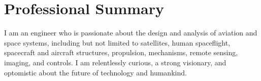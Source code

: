 \documentclass[10pt,final,sans]{resume}
\begin{document}
\setlength\headheight{28pt} %

\section{Professional Summary}
I am an engineer who is passionate about the design and analysis of
aviation and space systems, including but not limited to satellites, human
spaceflight, spacecraft and aircraft structures, propulsion, mechanisms, remote sensing, 
imaging, and controls. I am relentlessly curious, a strong visionary, and
optomistic about the future of technology and humankind.
\end{document}
